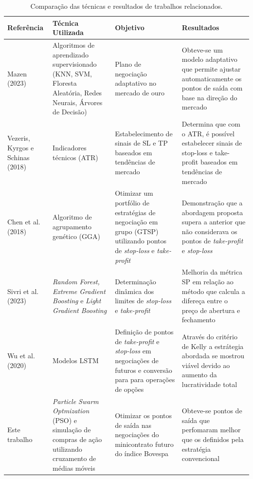 \documentclass{iftex2024}
\begin{document}
\begin{table}[htbp]
  \small
  \centering
  \begin{tabular}{|p{2.5cm}|p{3.5cm}|p{3.5cm}|p{4cm}|}
  \hline
  \textbf{Referência} & \textbf{Técnica Utilizada} & \textbf{Objetivo} & \textbf{Resultados} \\ \hline
  Mazen (2023) & Algoritmos de aprendizado supervisionado (KNN, SVM, Floresta Aleatória, Redes Neurais, Árvores de Decisão) & Plano de negociação adaptativo no mercado de ouro & Obteve-se um modelo adaptativo que permite ajustar automaticamente os pontos de saída com base na direção do mercado \\ \hline
  Vezeris, Kyrgos e Schinas (2018) & Indicadores técnicos (ATR) & Estabelecimento de sinais de SL e TP baseados em tendências de mercado & Determina que com o ATR, é possível estabelecer sinais de stop-loss e take-profit baseados em tendências de mercado \\ \hline
  Chen et al. (2018) & Algoritmo de agrupamento genético (GGA) & Otimizar um portfólio de estratégias de negociação em grupo (GTSP) utilizando pontos de \textit{stop-loss} e \textit{take-profit} & Demonstração que a abordagem proposta supera a anterior que não considerava os pontos de \textit{take-profit} e \textit{stop-loss} \\ \hline
  Sivri et al. (2023) & \textit{Random Forest, Extreme Gradient Boosting} e \textit{Light Gradient Boosting} & Determinação dinâmica dos limites de \textit{stop-loss} e \textit{take-profit} & Melhoria da métrica SP em relação ao método que calcula a difereça entre o preço de abertura e fechamento  \\ \hline
  Wu et al. (2020) & Modelos LSTM & Definição de pontos de \textit{take-profit} e \textit{stop-loss} em negociações de futuros e conversão para para operações de opções & Através do critério de Kelly a estrátegia abordada se mostrou viável devido ao aumento da lucratividade total \\ \hline
  Este trabalho & \textit{Particle Swarm Optmization} (PSO) e simulação de compras de ação utilizando cruzamento de médias móveis & Otimizar os pontos de saída nas negociações do minicontrato futuro do índice Bovespa & Obteve-se pontos de saída que perfomaram melhor que os definidos pela estratégia convencional \\ \hline
  \end{tabular}
  \caption{Comparação das técnicas e resultados de trabalhos relacionados.}
  \label{tab:trabalhos_relacionados}
  \end{table}
\end{document}
